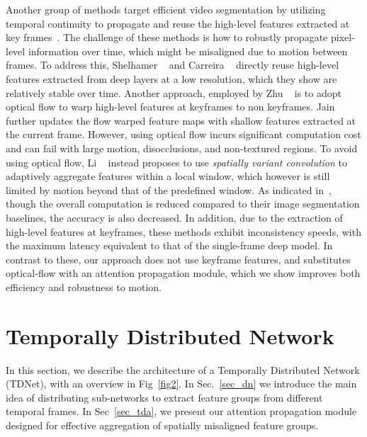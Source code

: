 \documentclass[10pt,twocolumn,letterpaper]{article}
\begin{document}
Another group of methods target efficient video segmentation by utilizing temporal continuity to propagate and reuse the high-level features extracted at key frames~\cite{shelhamer2016clockwork,zhu2017deep,jain2019accel,li2018low}. 
The challenge of these methods is how to robustly propagate pixel-level information over time, which might be misaligned due to motion between frames. 
To address this, Shelhamer \etal~\cite{shelhamer2016clockwork} and Carreira  \etal~\cite{carreira2018massively} directly reuse high-level features extracted from deep layers at a low resolution, which they show are relatively stable over time.
Another approach, employed by Zhu \etal~\cite{zhu2017deep} is to adopt optical flow to warp high-level features at keyframes to non keyframes.
Jain~\etal~\cite{jain2019accel} further updates the flow warped feature maps with shallow features extracted at the current frame.
However, using optical flow incurs significant computation cost and can fail with large motion, disocclusions, and non-textured regions. 
To avoid using optical flow, Li \etal~\cite{li2018low} instead proposes to use \textit{spatially variant convolution} to adaptively aggregate features within a local window, which however is still limited by motion beyond that of the predefined window. 
As indicated in~\cite{jain2019accel,li2018low,zhu2017deep}, though the overall computation is reduced compared to their image segmentation baselines, the accuracy is also decreased. In addition, due to the extraction of high-level features at keyframes, these methods exhibit inconsistency speeds, with the maximum latency equivalent to that of the single-frame deep model. In contrast to these, our approach does not use keyframe features, and substitutes optical-flow with an attention propagation module, which we show improves both efficiency and robustness to motion.
 
 




























%
 \section{Temporally Distributed Network}
In this section, we describe the architecture of a Temporally Distributed Network (TDNet), with an overview in Fig~\ref{fig2}.
In Sec.~\ref{sec_dn} we introduce the main idea of distributing sub-networks to extract feature groups from different temporal frames. In Sec~\ref{sec_tda}, we present our attention propagation module designed for effective aggregation of spatially misaligned feature groups.
\end{document}
